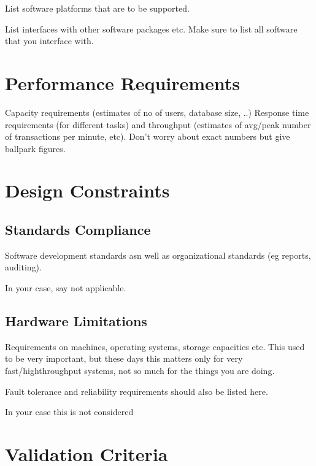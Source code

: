 \documentclass[a4wide]{article}
\begin{document}
\begin{itemize}
List software platforms that are to be supported.

List interfaces with other software packages etc.
Make sure to list all software that you interface with.



\section{Performance Requirements}

Capacity requirements (estimates of no of users, database size, ..)
Response time requirements (for different tasks)
and throughput (estimates of avg/peak number of transactions per minute, etc).
Don't worry about exact numbers but give ballpark figures.



\section{Design Constraints}

\subsection{Standards Compliance}

Software development standards asn well as organizational standards
(eg reports, auditing).

In your case, say not applicable.

\subsection{Hardware Limitations}

Requirements on machines, operating systems, storage capacities etc.
This used to be very important, but these days this matters only
for very fast/highthroughput systems, not so much for the things you
are doing.

Fault tolerance and reliability requirements should also be listed here.

In your case this is not considered


\section{Validation Criteria}


\end{itemize}
\end{document}
